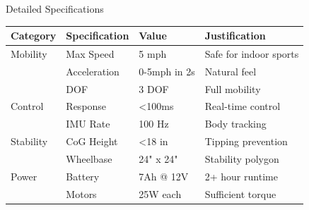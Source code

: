 \documentclass[aspectratio=169]{beamer}
\begin{document}
\begin{frame}{Detailed Specifications}
\tiny
\begin{tabular}{llll}
\toprule
\textbf{Category} & \textbf{Specification} & \textbf{Value} & \textbf{Justification} \\
\midrule
Mobility & Max Speed & 5 mph & Safe for indoor sports \\
& Acceleration & 0-5mph in 2s & Natural feel \\
& DOF & 3 DOF & Full mobility \\
Control & Response & <100ms & Real-time control \\
& IMU Rate & 100 Hz & Body tracking \\
Stability & CoG Height & <18 in & Tipping prevention \\
& Wheelbase & 24" x 24" & Stability polygon \\
Power & Battery & 7Ah @ 12V & 2+ hour runtime \\
& Motors & 25W each & Sufficient torque \\
\bottomrule
\end{tabular}
\end{frame}
\end{document}
